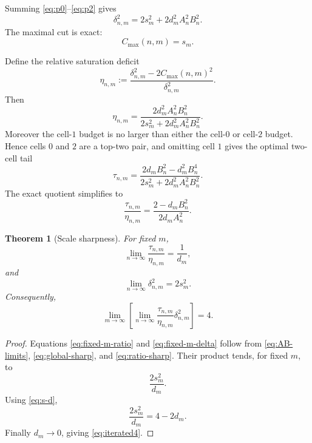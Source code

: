 \documentclass[11pt]{article}
\newtheorem{theorem}{Theorem}[section]
\newcommand{\cmax}{C_{\max}}
\newcommand{\dd}{\delta}
\newcommand{\etaq}{\eta}
\newcommand{\tauq}{\tau}
\begin{document}
Summing \eqref{eq:p0}--\eqref{eq:p2} gives
\begin{equation}\label{eq:global-sharp}
  \boxed{
  \dd_{n,m}^2
  =
  2s_m^2+
  2d_m^2A_n^2B_n^2.
  }
\end{equation}
The maximal cut is exact:
\begin{equation}\label{eq:cmax-sharp}
  \boxed{
  \cmax(n,m)=s_m.
  }
\end{equation}

Define the relative saturation deficit
\[
  \etaq_{n,m}
  :=
  \frac{\dd_{n,m}^2-2\cmax(n,m)^2}{\dd_{n,m}^2}.
\]
Then
\begin{equation}\label{eq:eta-sharp}
  \boxed{
  \etaq_{n,m}
  =
  \frac{
    2d_m^2A_n^2B_n^2
  }{
    2s_m^2+2d_m^2A_n^2B_n^2
  }.
  }
\end{equation}
Moreover the cell-$1$ budget is no larger than either the cell-$0$ or
cell-$2$ budget.  Hence cells $0$ and $2$ are a top-two pair, and omitting
cell $1$ gives the optimal two-cell tail
\begin{equation}\label{eq:tau-sharp}
  \tauq_{n,m}
  =
  \frac{
    2d_mB_n^2-d_m^2B_n^4
  }{
    2s_m^2+2d_m^2A_n^2B_n^2
  }.
\end{equation}
The exact quotient simplifies to
\begin{equation}\label{eq:ratio-sharp}
  \boxed{
  \frac{\tauq_{n,m}}{\etaq_{n,m}}
  =
  \frac{2-d_mB_n^2}{2d_mA_n^2}.
  }
\end{equation}

\begin{theorem}[Scale sharpness]\label{thm:scale-sharp}
For fixed $m$,
\begin{equation}\label{eq:fixed-m-ratio}
  \lim_{n\to\infty}
  \frac{\tauq_{n,m}}{\etaq_{n,m}}
  =
  \frac1{d_m},
\end{equation}
and
\begin{equation}\label{eq:fixed-m-delta}
  \lim_{n\to\infty}\dd_{n,m}^2=2s_m^2.
\end{equation}
Consequently,
\begin{equation}\label{eq:iterated4}
  \boxed{
  \lim_{m\to\infty}
  \left[
    \lim_{n\to\infty}
    \frac{\tauq_{n,m}}{\etaq_{n,m}}
    \dd_{n,m}^2
  \right]
  =4.
  }
\end{equation}
\end{theorem}

\begin{proof}
Equations \eqref{eq:fixed-m-ratio} and \eqref{eq:fixed-m-delta} follow from
\eqref{eq:AB-limits}, \eqref{eq:global-sharp}, and
\eqref{eq:ratio-sharp}.  Their product tends, for fixed $m$, to
\[
  \frac{2s_m^2}{d_m}.
\]
Using \eqref{eq:s-d},
\[
  \frac{2s_m^2}{d_m}
  =
  4-2d_m.
\]
Finally $d_m\to0$, giving \eqref{eq:iterated4}.
\end{proof}
\end{document}
